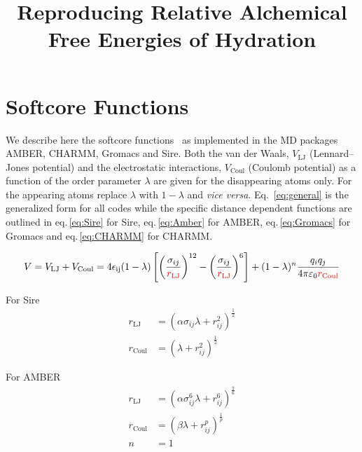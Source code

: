 \documentclass[journal=jctcce,manuscript=suppinfo]{achemso}
\title{Reproducing Relative Alchemical Free Energies of Hydration}
\begin{document}
\maketitle



\section{Softcore Functions}

We describe here the softcore functions~\cite{beutler_avoiding_1994,
  zacharias_separationshifted_1994} as implemented in the MD packages
AMBER, CHARMM, Gromacs and Sire.  Both the van der Waals,
$V_{\mathrm{LJ}}$ (Lennard--Jones potential) and the electrostatic
interactions, $V_{\mathrm{Coul}}$ (Coulomb potential) as a function of
the order parameter $\lambda$ are given for the disappearing atoms
only.  For the appearing atoms replace $\lambda$ with $1 - \lambda$
and \emph{vice versa}.  Eq.\ \eqref{eq:general} is the generalized
form for all codes while the specific distance dependent functions are
outlined in eq.\,\eqref{eq:Sire} for Sire, eq.\,\eqref{eq:Amber} for
AMBER, eq.\,\eqref{eq:Gromacs} for Gromacs and eq.\,\eqref{eq:CHARMM}
for CHARMM.

\begin{equation}
  V = V_{\mathrm{LJ}} + V_{\mathrm{Coul}} =
  4\epsilon_{\mathrm{ij}}(1 - \lambda) \left[ \left(
      \frac{\sigma_{ij}}{\textcolor{red}{r_{\mathrm{LJ}}}}
    \right)^{12} - \left(
      \frac{\sigma_{ij}}{\textcolor{red}{r_{\mathrm{LJ}}}} \right)^{
      6} \right] +
  (1 - \lambda)^{n} \frac{q_{i}q_{j}}
  {4\pi\varepsilon_{0}\textcolor{red}{r_{\mathrm{Coul}}}}
  \label{eq:general}
\end{equation}

For Sire
\begin{equation}
  \begin{split}
    r_{\mathrm{LJ}} &= (\alpha\sigma_{ij}\lambda + r_{ij}^2)^{\frac{1}{2}} \\
    r_{\mathrm{Coul}} &=  (\lambda + r_{ij}^2)^{\frac{1}{2}}
  \end{split}
  \label{eq:Sire}
\end{equation}

For AMBER
\begin{equation}
  \begin{split}
    r_{\mathrm{LJ}} &= (\alpha \sigma_{ij}^{6} \lambda + %
                         r_{ij}^6)^{\frac{1}{6}} \\
    r_{\mathrm{Coul}} &= (\beta\lambda + r_{ij}^{p})^{\frac{1}{p}} \\
    n &= 1
  \end{split}
  \label{eq:Amber}
\end{equation}
\end{document}
